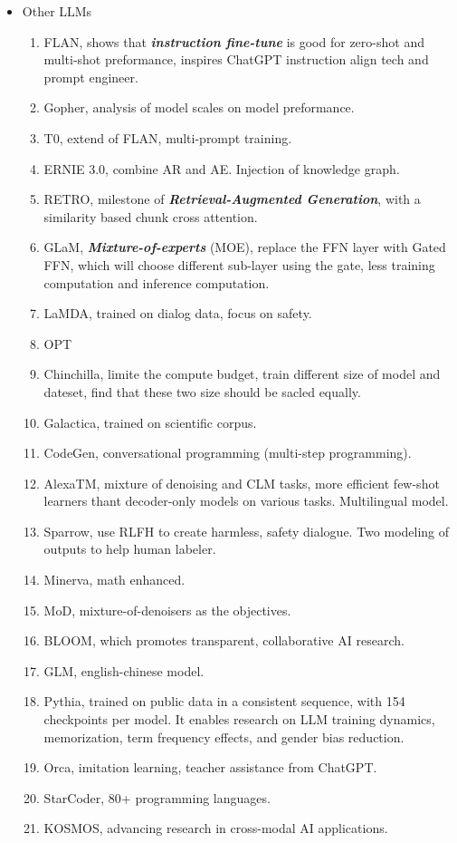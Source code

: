 \documentclass[10pt]{elegantbook}
\newcommand{\mydefination}[1]{\textbf{\textit{\textcolor{structurecolor}{#1}}}}
\begin{document}
\begin{itemize}
    \item Other LLMs
    \begin{enumerate}
        \item FLAN, shows that \mydefination{instruction fine-tune} is good for zero-shot and multi-shot preformance, inspires ChatGPT instruction align tech and prompt engineer.
        \item Gopher, analysis of model scales on model preformance.
        \item T0, extend of FLAN, multi-prompt training.
        \item ERNIE 3.0, combine AR and AE. Injection of knowledge graph.
        \item RETRO, milestone of \mydefination{Retrieval-Augmented Generation}, with a similarity based chunk cross attention.
        \item GLaM, \mydefination{Mixture-of-experts} (MOE), replace the FFN layer with Gated FFN, which will choose different sub-layer using the gate, 
    less training computation and inference computation.
        \item LaMDA, trained on dialog data, focus on safety.
        \item OPT
        \item Chinchilla, limite the compute budget, train different size of model and dateset, find that these two size should be sacled equally.
        \item Galactica, trained on scientific corpus.
        \item CodeGen, conversational programming (multi-step programming).
        \item AlexaTM, mixture of denoising and CLM tasks, more efficient few-shot learners thant decoder-only models on various tasks. Multilingual model.
        \item Sparrow, use RLFH to create harmless, safety dialogue. Two modeling of outputs to help human labeler.
        \item Minerva, math enhanced.
        \item MoD, mixture-of-denoisers as the objectives.
        \item BLOOM, which promotes transparent, collaborative AI research.
        \item GLM, english-chinese model.
        \item Pythia, trained on public data in a consistent sequence, with 154 checkpoints per model. It enables research on LLM training dynamics, 
    memorization, term frequency effects, and gender bias reduction.
        \item Orca, imitation learning, teacher assistance from ChatGPT.
        \item StarCoder, 80+ programming languages.
        \item KOSMOS, advancing research in cross-modal AI applications.
    \end{enumerate}
\end{itemize}
\end{document}
